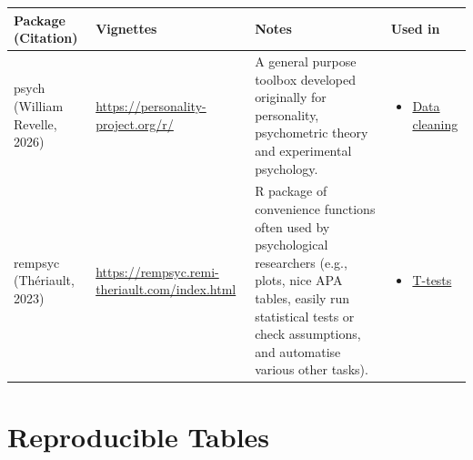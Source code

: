 \documentclass[
  letterpaper,
  DIV=11,
  numbers=noendperiod]{scrreprt}
\providecommand{\tightlist}{%
  \setlength{\itemsep}{0pt}\setlength{\parskip}{0pt}}\usepackage{longtable,booktabs,array}
\begin{document}
\begin{longtable}[]{@{}
  >{\raggedright\arraybackslash}p{}
  >{\raggedright\arraybackslash}p{}
  >{\raggedright\arraybackslash}p{}
  >{\raggedright\arraybackslash}p{}@{}}
\toprule\noalign{}
\begin{minipage}[b]{\linewidth}\raggedright
Package (Citation)
\end{minipage} & \begin{minipage}[b]{\linewidth}\raggedright
Vignettes
\end{minipage} & \begin{minipage}[b]{\linewidth}\raggedright
Notes
\end{minipage} & \begin{minipage}[b]{\linewidth}\raggedright
Used in
\end{minipage} \\
\midrule\noalign{}
\endhead
\bottomrule\noalign{}
\endlastfoot
psych (William Revelle, 2026) & \url{https://personality-project.org/r/}
& A general purpose toolbox developed originally for personality,
psychometric theory and experimental psychology. &
\begin{minipage}[t]{\linewidth}\raggedright
\begin{itemize}
\tightlist
\item
  \href{data-cleaning-overview.qmd}{Data cleaning}
\end{itemize}
\end{minipage} \\
rempsyc (Thériault, 2023) &
\url{https://rempsyc.remi-theriault.com/index.html} & R package of
convenience functions often used by psychological researchers (e.g.,
plots, nice APA tables, easily run statistical tests or check
assumptions, and automatise various other tasks). &
\begin{minipage}[t]{\linewidth}\raggedright
\begin{itemize}
\tightlist
\item
  \href{t-tests.qmd}{T-tests}
\end{itemize}
\end{minipage} \\
\end{longtable}

\section{Reproducible Tables}\label{reproducible-tables-1}
\end{document}
